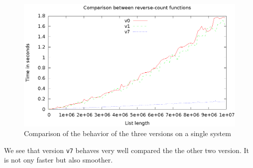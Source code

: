 \begin{figure}[htb]
\centering
\includegraphics{v0-v1-v7.eps}
\caption{\label{f-versions} Comparison of the behavior of the three versions on a single system}
\end{figure}

We see that version \texttt{v7} behaves very well compared the the other two version.
It is not ony faster but also smoother.

